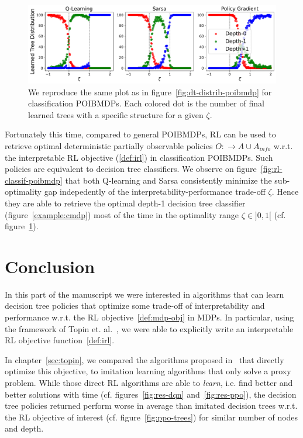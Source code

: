 \begin{figure}
    \centering
    \includegraphics[width=1\textwidth]{images/images_part1/tree_distributions_classif.pdf}
    \caption{We reproduce the same plot as in figure~\ref{fig:dt-distrib-poibmdp} for classification POIBMDPs. Each colored dot is the number of final learned trees with a specific structure for a given $\zeta$.}\label{fig:tree-distrib-classif-poibmdp}
\end{figure}

Fortunately this time, compared to general POIBMDPs, RL can be used to retrieve optimal deterministic partially observable policies $O:\rightarrow A\cup A_{info}$ w.r.t. the interpretable RL objective (\ref{def:irl}) in classification POIBMDPs.
Such policies are equivalent to decision tree classifiers.
We observe on figure~\ref{fig:rl-classif-poibmdp} that both Q-learning and Sarsa consistently minimize the sub-optimality gap indepedently of the interpretability-performance trade-off $\zeta$. 
Hence they are able to retrieve the optimal depth-1 decision tree classifier (figure~\ref{example:cmdp}) most of the time in the optimality range $\zeta\in ]0, 1[$ (cf. figure~\ref{fig:tree-distrib-classif-poibmdp}).


\section{Conclusion}\label{sec:ccl-pomdp}
In this part of the manuscript we were interested in algorithms that can learn decision tree policies that optimize some trade-off of interpretability and performance w.r.t. the RL objective~\ref{def:mdp-obj} in MDPs.
In particular, using the framework of Topin et. al.~\cite{topin2021iterative}, we were able to explicitly write an interpretable RL objective function~\ref{def:irl}.

In chapter~\ref{sec:topin}, we compared the algorithms proposed in~\cite{topin2021iterative} that directly optimize this objective, to imitation learning algorithms that only solve a proxy problem.
While those direct RL algorithms are able to \textit{learn}, i.e. find better and better solutions with time (cf. figures~\ref{fig:res-dqn} and~\ref{fig:res-ppo}), the decision tree policies returned perform worse in average than imitated decision trees w.r.t. the RL objective of interest (cf. figure~\ref{fig:ppo-trees}) for similar number of nodes and depth.

